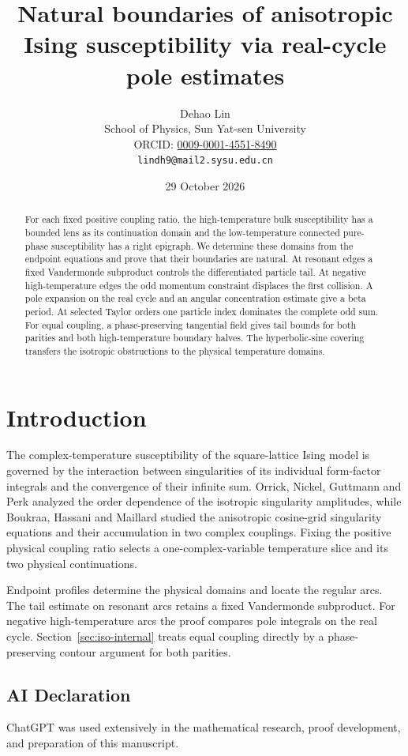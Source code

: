 \documentclass[11pt]{article}
\title{Natural boundaries of anisotropic Ising susceptibility\newline
via real-cycle pole estimates}
\author{Dehao Lin\\{\small School of Physics, Sun Yat-sen University}\\{\small ORCID: \href{https://orcid.org/0009-0001-4551-8490}{0009-0001-4551-8490}}\\{\small\texttt{lindh9@mail2.sysu.edu.cn}}}
\date{29 October 2026}
\numberwithin{equation}{section}
\theoremstyle{definition}
\begin{document}
\maketitle
\begin{abstract}
For each fixed positive coupling ratio, the high-temperature bulk
susceptibility has a bounded lens as its continuation domain and the
low-temperature connected pure-phase susceptibility has a right
epigraph. We determine these domains from the endpoint equations and
prove that their boundaries are natural. At resonant edges a fixed
Vandermonde subproduct controls the differentiated particle tail.
At negative high-temperature edges the odd momentum constraint
displaces the first collision. A pole expansion on the real cycle and
an angular concentration estimate give a beta period. At selected
Taylor orders one particle index dominates the complete odd sum.
For equal coupling, a phase-preserving tangential field gives tail
bounds for both parities and both high-temperature boundary halves.
The hyperbolic-sine covering transfers the isotropic obstructions to
the physical temperature domains.
\end{abstract}
\section*{Introduction}
The complex-temperature susceptibility of the square-lattice Ising model
is governed by the interaction between singularities of its individual
form-factor integrals and the convergence of their infinite sum.
Orrick, Nickel, Guttmann and Perk \cite[Section 3.2]{ONGP} analyzed the
order dependence of the isotropic singularity amplitudes, while
Boukraa, Hassani and Maillard \cite[Section 6.2]{BHM} studied the
anisotropic cosine-grid singularity equations and their accumulation
in two complex couplings. Fixing the positive physical coupling ratio
selects a one-complex-variable temperature slice and its two physical
continuations.

Endpoint profiles determine the physical domains and locate the regular
arcs. The tail estimate on resonant arcs retains a fixed Vandermonde
subproduct. For negative high-temperature arcs the proof compares
pole integrals on the real cycle. Section~\ref{sec:iso-internal}
treats equal coupling directly by a phase-preserving contour
argument for both parities.

\subsection*{AI Declaration}
ChatGPT was used extensively in the mathematical research, proof development,
and preparation of this manuscript.
\end{document}
